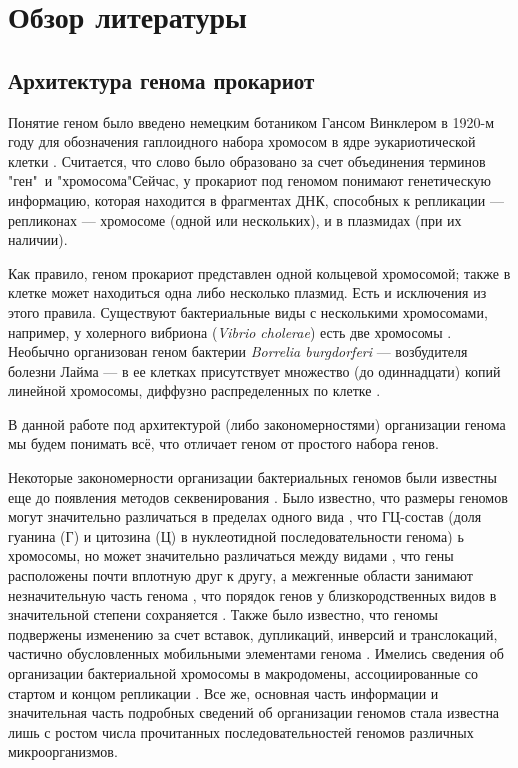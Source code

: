 \chapter{Обзор литературы} \label{chapt1}

\section{Архитектура генома прокариот} \label{sect1_1}
Понятие геном было введено немецким ботаником Гансом Винклером в 1920-м году для обозначения гаплоидного набора хромосом в ядре эукариотической клетки \cite{noguera2013genome}. Считается, что слово было образовано за счет объединения терминов "ген"\ и "хромосома"\. Сейчас, у прокариот под геномом понимают генетическую информацию, которая находится в фрагментах ДНК, способных к репликации --- репликонах --- хромосоме (одной или нескольких), и в плазмидах (при их наличии).  

Как правило, геном прокариот представлен одной кольцевой хромосомой; также в клетке может находиться одна либо несколько плазмид. Есть и исключения из этого правила. Существуют бактериальные виды с несколькими хромосомами, например, у холерного вибриона (\textit{Vibrio cholerae}) есть две хромосомы \cite{trucksis1998vibrio}. Необычно организован геном бактерии \textit{Borrelia burgdorferi} --- возбудителя болезни Лайма --- в ее клетках присутствует множество (до одиннадцати) копий линейной хромосомы, диффузно распределенных по клетке \cite{hinnebusch1997bacterial}.

В данной работе под архитектурой (либо закономерностями) организации генома мы будем понимать всё, что отличает геном от простого набора генов. 

Некоторые закономерности организации бактериальных геномов были известны еще до появления методов секвенирования \cite{bobay2017evolution}. Было известно, что размеры геномов могут значительно различаться в пределах одного вида \cite{herdman1985evolution}, что ГЦ-состав (доля гуанина (Г) и цитозина (Ц) в нуклеотидной последовательности генома) ь хромосомы, но может значительно различаться между видами \cite{thomas2008mosaic}, что гены расположены почти вплотную друг к другу, а межгенные области занимают незначительную часть генома \cite{mira2001deletional}, что порядок генов у близкородственных видов в значительной степени сохраняется \cite{rocha2008organization}. Также было известно, что геномы подвержены изменению за счет вставок, дупликаций, инверсий и транслокаций, частично обусловленных мобильными элементами генома \cite{eisen2000evidence}. Имелись сведения об организации бактериальной хромосомы в макродомены, ассоциированные со стартом и концом репликации \cite{boccard2005spatial}. Все же, основная часть информации и значительная часть подробных сведений об организации геномов стала известна лишь с ростом числа прочитанных последовательностей геномов различных микроорганизмов. 

